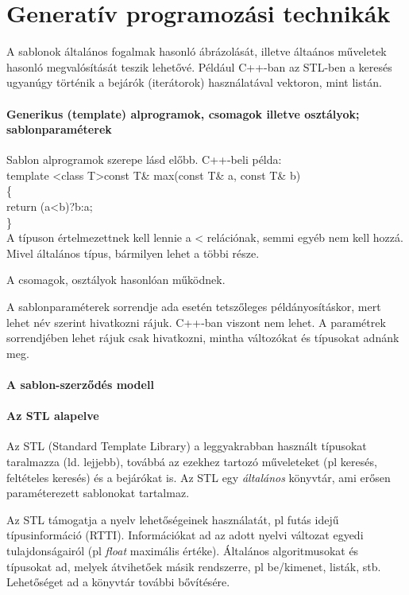 \documentclass[fleqn,10pt,a4paper]{article}
\theoremstyle{magyar}
\begin{document}
  \newpage
  \section{Generatív programozási technikák}
  A sablonok általános fogalmak hasonló ábrázolását, illetve áltaános
  műveletek hasonló megvalósítását teszik lehetővé. Például C++-ban az
  STL-ben a keresés ugyanúgy történik a bejárók (iterátorok)
  használatával vektoron, mint listán.


  \paragraph[Sablon alprogramok, csomagok, osztályok és
    paraméterek]{Generikus (template) alprogramok, csomagok illetve
    osztályok; sablonparaméterek}
  Sablon alprogramok szerepe lásd előbb. C++-beli példa:\\
  template \textless class T\textgreater const T\& max(const T\& a, const T\& b)\\
  \{\\
  \hspace{.5em}return (a\textless b)?b:a;\\
  \}\\
  A típuson értelmezettnek kell lennie a < relációnak, semmi egyéb nem
  kell hozzá. Mivel általános típus, bármilyen lehet a többi része.
  
  A csomagok, osztályok hasonlóan működnek.
  
  A sablonparaméterek sorrendje ada esetén tetszőleges
  példányosításkor, mert lehet név szerint hivatkozni rájuk. C++-ban
  viszont nem lehet. A paramétrek sorrendjében lehet rájuk csak
  hivatkozni, mintha változókat és típusokat adnánk meg.
  
  \paragraph{A sablon-szerződés modell}

  \paragraph{Az STL alapelve}
  Az STL (Standard Template Library) a leggyakrabban használt
  típusokat taralmazza (ld. lejjebb), továbbá az ezekhez tartozó
  műveleteket (pl keresés, feltételes keresés) és a bejárókat is. Az
  STL egy \emph{általános} könyvtár, ami erősen paraméterezett
  sablonokat tartalmaz.
  
  Az STL támogatja a nyelv lehetőségeinek használatát, pl futás idejű
  típusinformáció (RTTI). Információkat ad az adott nyelvi változat
  egyedi tulajdonságairól (pl \emph{float} maximális
  értéke). Általános algoritmusokat és típusokat ad, melyek átvihetőek
  másik rendszerre, pl be/kimenet, listák, stb. Lehetőséget ad a
  könyvtár további bővítésére.
\end{document}
